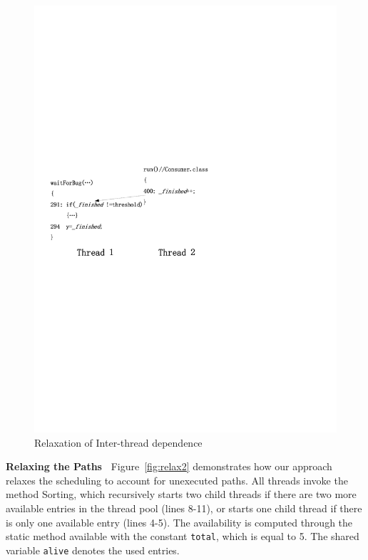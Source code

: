  

\begin{figure}[htp]
\centering
\includegraphics[scale=0.7]{cases/Visio-bbuffer.pdf}
\caption{Relaxation of Inter-thread dependence}\label{fig:relax1}
\end{figure}

{\bf Relaxing the Paths\ } Figure~\ref{fig:relax2} demonstrates how our approach relaxes the scheduling to account for  unexecuted paths. 
All threads invoke the method {\sf Sorting}, which recursively starts two child threads if there are two more available entries in the thread pool (lines 8-11), or  starts one child thread if there is only one available entry (lines 4-5).  The availability is computed through the static method {\sf available} with the constant {\tt total}, which is equal to 5. The shared variable {\tt alive} denotes the used entries.

